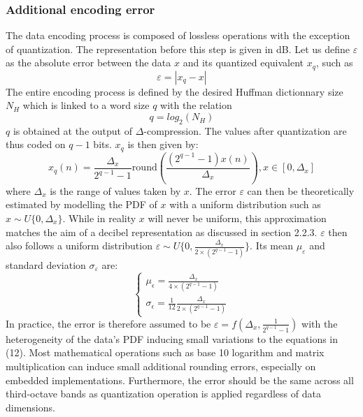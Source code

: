 \documentclass[12pt,times,onecolumn]{article}
\begin{document}
\subsubsection{Additional encoding error}
The data encoding process is composed of lossless operations with the exception of quantization. The representation before this step is given in dB. Let us define $\varepsilon$ as the absolute error between the data $x$ and its quantized equivalent $x_q$, such as
\begin{equation}
\varepsilon = |x_q-x|
\end{equation}
The entire encoding process is defined by the desired Huffman dictionnary size $N_H$ which is linked to a word size $q$ with the relation
\begin{equation}
q = log_2(N_H)
\end{equation}
$q$ is obtained at the output of $\Delta$-compression. The values after quantization are thus coded on $q-1$ bits. $x_q$ is then given by:
\begin{equation}
x_q(n) = \frac{\Delta_x}{2^{q-1}-1}\textrm{round}\left(\frac{(2^{q-1}-1)x(n)}{\Delta_x}\right), x\in \left[0, \Delta_x\right]
\end{equation}
where $\Delta_x$ is the range of values taken by $x$. The error $\varepsilon$ can then be theoretically estimated by modelling the PDF of $x$ with a uniform distribution such as $x\sim \textit{U}\{0, \Delta_x\}$. While in reality $x$ will never be uniform, this approximation matches the aim of a decibel representation as discussed in section 2.2.3. $\varepsilon$ then also follows a uniform distribution $\varepsilon\sim U\{0, \frac{\Delta_x}{2\times (2^{q-1}-1)}\}$. Its mean $\mu_\varepsilon$ and standard deviation $\sigma_\varepsilon$ are:
\begin{equation} \label{eq:13}
\begin{cases}
	\mu_\epsilon = \frac{\Delta_x}{4\times (2^{q-1}-1)}\\
	\sigma_\epsilon = \frac{1}{12}\frac{\Delta_x}{2\times (2^{q-1}-1)}
\end{cases}
\end{equation}
In practice, the error is therefore assumed to be $\varepsilon = f(\Delta_x, \frac{1}{2^{q-1}-1})$ with the heterogeneity of the data's PDF inducing small variations to the equations in (12). Most mathematical operations such as base 10 logarithm and matrix multiplication can induce small additional rounding errors, especially on embedded implementations. Furthermore, the error should be the same across all third-octave bands as quantization operation is applied regardless of data dimensions.\\
\end{document}

